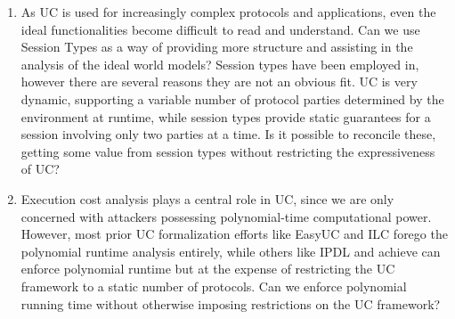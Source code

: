 \begin{enumerate}
\item 
As UC is used for increasingly complex protocols and applications, even the ideal functionalities become difficult to read and understand. Can we use Session Types as a way of providing more structure and assisting in the analysis of the ideal world models?
Session types have been employed in, however there are several reasons they are not an obvious fit.
UC is very dynamic, supporting a variable number of protocol parties determined by the environment at runtime, while session types provide static guarantees for a session involving only two parties at a time.
Is it possible to reconcile these, getting some value from session types without restricting the expressiveness of UC?

\item Execution cost analysis plays a central role in UC, since we are only concerned with
attackers possessing polynomial-time computational power.
However, most prior UC formalization efforts like EasyUC and ILC forego the polynomial runtime analysis entirely, while others like IPDL and achieve can enforce polynomial runtime but at the expense of restricting the UC framework to a static number of protocols.
Can we enforce polynomial running time without otherwise imposing restrictions on the UC framework?

\end{enumerate}

